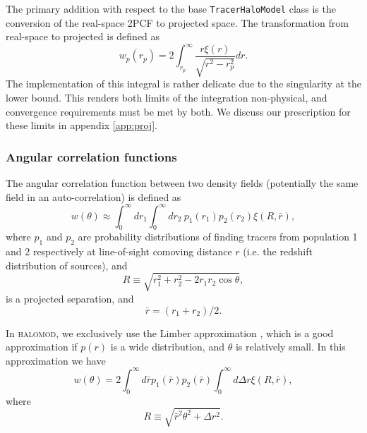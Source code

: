 \documentclass[5p,aas_macros]{elsarticle}
\newcommand{\halomod}{\textsc{halomod}}
\begin{document}


The primary addition with respect to the base \texttt{Tracer\-Halo\-Model} class is the conversion of the real-space 2PCF to projected space. The transformation from real-space to projected is defined as
\begin{equation}
	\label{eq:wprp}
	w_p(r_p) = 2\int_{r_p}^\infty \frac{r\xi(r)}{\sqrt{r^2-r_p^2}}dr.
\end{equation}
The implementation of this integral is rather delicate due to the singularity at the lower bound. 
This renders both limits of the integration non-physical, and convergence requirements must be met by both. We discuss our prescription for these limits in appendix \ref{app:proj}.

\subsubsection{Angular correlation functions}
\label{sec:halomod:frameworks:angular}
The angular correlation function between two density fields (potentially the same field in an auto-correlation) is defined as \citep{Simon2007}
\begin{equation}
    w(\theta) \approx \int_0^\infty dr_1\int_0^\infty dr_2\ p_1(r_1) p_2(r_2) \xi(R,\bar{r}),
\end{equation} 
where $p_1$ and $p_2$ are probability distributions of finding tracers from population 1 and 2 respectively at line-of-sight comoving distance $r$ (i.e. the redshift distribution of sources), and
\begin{equation}
   R \equiv \sqrt{r_1^2 + r_2^2 - 2r_1r_2 \cos \theta}, 
\end{equation}
is a projected separation, and 
\begin{equation}
   \bar{r} = (r_1+r_2)/2. 
\end{equation}

In \halomod, we exclusively use the Limber approximation \citep{Limber1953},
which is a good approximation if $p(r)$ is a wide distribution, and $\theta$ is relatively small. In this approximation we have
\begin{equation}
   w(\theta) = 2\int_0^\infty d\bar{r} p_1(\bar{r}) p_2(\bar{r}) \int_0^{\infty} d\Delta r \xi(R,\bar{r}), 
\end{equation}
where 
\begin{equation}
   R \equiv \sqrt{\bar{r}^2 \theta^2 + \Delta r^2}.
\end{equation}
\end{document}

